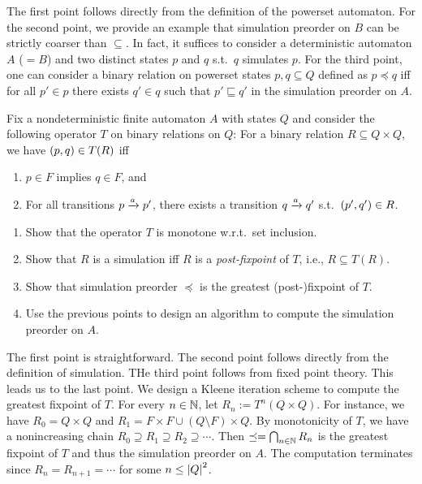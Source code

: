\begin{solution}
    The first point follows directly from the definition of the powerset automaton.
    For the second point, we provide an example that simulation preorder on $B$ can be strictly coarser than $\subseteq$.
    In fact, it suffices to consider a deterministic automaton $A$ ($= B$)
    and two distinct states $p$ and $q$ s.t.~$q$ simulates $p$.
    For the third point, one can consider a binary relation on powerset states $p, q \subseteq Q$
    defined as $p \preceq q$ iff for all $p' \in p$ there exists $q' \in q$ such that $p' \sqsubseteq q'$ in the simulation preorder on $A$.
\end{solution}

\begin{exercise}
    Fix a nondeterministic finite automaton $A$ with states $Q$
    and consider the following operator $T$ on binary relations on $Q$:
    For a binary relation $R \subseteq Q \times Q$,
    we have $\left( p, q \right) \in T(R)$ iff
    \begin{enumerate}
        \item[(a)] $p \in F$ implies $q \in F$, and
        \item[(b)] For all transitions $p \xrightarrow{a} p'$,
        there exists a transition $q \xrightarrow{a} q'$ s.t.~$\left( p', q' \right) \in R$.
    \end{enumerate}
    \begin{enumerate}
        \item Show that the operator $T$ is monotone w.r.t.~set inclusion.
        \item Show that $R$ is a simulation iff $R$ is a \emph{post-fixpoint} of $T$,
        i.e., $R \subseteq T(R)$.
        \item Show that simulation preorder $\preceq$ is the greatest (post-)fixpoint of $T$.
        \item Use the previous points to design an algorithm to compute the simulation preorder on $A$.
    \end{enumerate}
\end{exercise}
\begin{solution}
    The first point is straightforward.
    The second point follows directly from the definition of simulation.
    THe third point follows from fixed point theory.
    This leads us to the last point.
    We design a Kleene iteration scheme to compute the greatest fixpoint of $T$.
    For every $n \in \mathbb N$, let $R_n := T^n(Q \times Q)$.
    For instance, we have $R_0 = Q \times Q$ and $R_1 = F \times F \cup (Q \setminus F) \times Q$.
    By monotonicity of $T$, we have a nonincreasing chain $R_0 \supseteq R_1 \supseteq R_2 \supseteq \cdots$.
    Then $\preceq = \bigcap_{n \in \mathbb N} R_n$ is the greatest fixpoint of $T$ and thus the simulation preorder on $A$.
    The computation terminates since $R_n = R_{n+1} = \cdots$ for some $n \leq \left| Q \right|^2$.
\end{solution}

